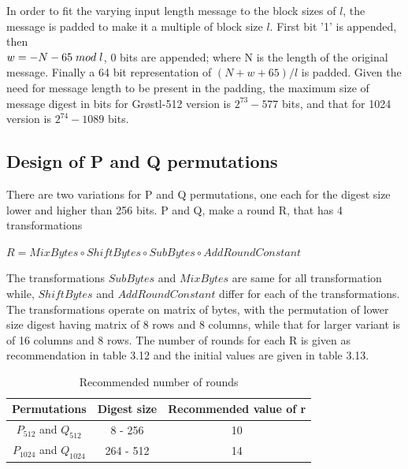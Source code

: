   In order to fit the varying input length message to the block sizes of $ l $, the message is padded to make it a
  multiple of block size $l$. First bit '1' is
  appended, then\\ $ w = -N - 65 \thickspace mod \thickspace l $, 0 bits are appended; where N is the length of the
  original message. Finally a 64 bit representation of $(N + w + 65) / l $ is padded. Given the need for message length
  to be present in the padding, the maximum size of message digest in bits for Gr{\o}stl-512 version is 
  $2^{73}-577$ bits, and that for 1024 version is $2^{74}-1089$ bits.

  \subsection{Design of P and Q permutations}

  There are two variations for P and Q permutations, one each for the digest size lower and higher than 256 bits. P
  and Q, make a round R, that has 4 transformations
  \begin{center}$ R = MixBytes \circ ShiftBytes \circ SubBytes \circ AddRoundConstant $ \end{center}
  The transformations $SubBytes$ and $MixBytes$ are same for all transformation while, $ShiftBytes$ and $AddRoundConstant$
  differ for each of the transformations. The transformations operate on matrix of bytes, with the permutation of lower size
  digest having matrix of 8 rows and 8 columns, while that for larger variant is of 16 columns and 8 rows. The number of 
  rounds for each R is given as recommendation in table 3.12 and the initial values are given in table 3.13.
  
  \begin{table}
    \begin{center}
      \begin{tabular}{ *{3}{c} } \hline
        Permutations            & Digest size & Recommended value of r \\ \hline
        $P_{512}$ and $Q_{512}$   & 8 - 256     & 10 \\
        $P_{1024}$ and $Q_{1024}$ & 264 - 512   & 14 \\ \hline 
      \end{tabular}
      \caption{Recommended number of rounds \cite{00019}}
    \end{center}
  \end{table}

